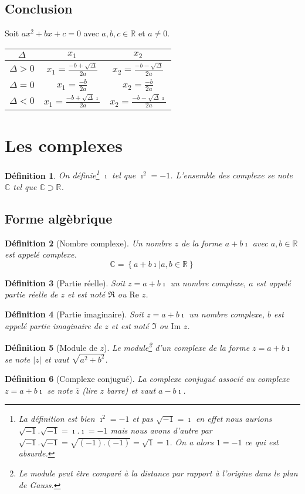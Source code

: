 \documentclass[a4paper,10pt]{report}
\newtheorem{de}{Définition}
\begin{document}
\subsection{Conclusion}
Soit $ax^2+bx+c=0$ avec $a,b,c \in \mathbb{R}$ et $a \neq 0$.

\begin{center}
\begin{tabular}{ c | c | c }
$\Delta$ & $x_1$ & $x_2$ \\ \hline
$\Delta > 0$ & $x_1=\frac{-b+\sqrt{\Delta}}{2a}$ & $x_2=\frac{-b-\sqrt{\Delta}}{2a}$\\ \hline
$\Delta = 0$ & $x_1=\frac{-b}{2a}$ & $x_2=\frac{-b}{2a}$\\ \hline
$\Delta < 0$ & $x_1=\frac{-b+\sqrt{\Delta}\imath}{2a}$ & $x_2=\frac{-b-\sqrt{\Delta}\imath}{2a}$ 
\end{tabular}
\end{center}

\section{Les complexes}
\begin{de}
On définie\footnote{La définition est bien $\imath^2=-1$ et pas $\sqrt{-1}=\imath$ en effet nous aurions $\sqrt{-1}.\sqrt{-1}=\imath.\imath=-1$ mais nous avons d'autre par $\sqrt{-1}.\sqrt{-1}=\sqrt{(-1).(-1)}=\sqrt{1}=1$. On a alors $1=-1$ ce qui est absurde.} $\imath$ tel que $\imath^2=-1$. L'ensemble des complexe se note $\mathbb{C}$ tel que $\mathbb{C} \supset \mathbb{R}$.
\end{de}
\subsection{Forme algèbrique}
\begin{de}[Nombre complexe]
Un nombre $z$ de la forme $a+b\imath$ avec $a,b \in \mathbb{R}$ est appelé complexe.
$$\mathbb{C}=\left\lbrace a+b\imath \vert a,b \in \mathbb{R} \right\rbrace $$
\end{de}
\begin{de}[Partie réelle]
Soit $z=a+b\imath$ un nombre complexe, $a$ est appelé partie réelle de $z$ et est noté $\Re$ ou $\mbox{Re }z$.
\end{de}
\begin{de}[Partie imaginaire]
Soit $z=a+b\imath$ un nombre complexe, $b$ est appelé partie imaginaire de $z$ et est noté $\Im$ ou $\mbox{Im }z$.
\end{de}
\begin{de}[Module de $z$]
Le module\footnote{Le module peut être comparé à la distance par rapport à l'origine dans le plan de Gauss.} d'un complexe de la forme $z=a+b\imath$ se note $\vert z \vert$ et vaut $\sqrt{a^2+b^2}$.
\end{de}
\begin{de}[Complexe conjugué]
La complexe conjugué associé au complexe $z=a+b\imath$ se note $\overline{z}$ (lire $z$ barre) et vaut $a-b\imath$.
\end{de}
\end{document}

